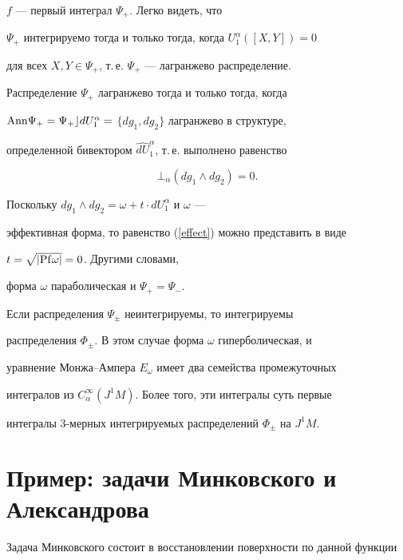 \begin{pf}
$f$ --- первый интеграл $\Psi_{+}$. Легко видеть, что


$\Psi_{+}$ интегрируемо тогда и только тогда, когда $U_1^\alpha ([X,Y])=0$ 


для всех $X,Y\in \Psi_+$, т.\,е. $\Psi_+$ --- лагранжево распределение.


Распределение $\Psi_{+}$ лагранжево тогда и только тогда, когда 


${\Ann}\Psi


_{+}=\Psi_{+}\rfloor dU_1^\alpha =$ $\{dg_1,dg_2\}$ лагранжево в структуре,


определенной бивектором $\widehat{dU}_1^\alpha $, т.\,е. выполнено равенство


\begin{equation}


\bot_\alpha (dg_1\wedge dg_2)=0. \label{effect}


\end{equation}


Поскольку $dg_1\wedge dg_2=\omega +t\cdot dU_1^\alpha $ и $\omega$ ---


эффективная форма, то равенство (\ref{effect}) можно представить в виде


$t=\sqrt{| {\operatorname{Pf}}\omega|}=0$. Другими словами,


форма $\omega$ параболическая и $\Psi_{+}=\Psi_{-}$.





Если распределения $\Psi_{\pm }$ неинтегрируемы, то интегрируемы 


распределения $\Phi_{\pm }$. В этом случае форма $\omega$ гиперболическая, и


уравнение Монжа--Ампера $E_\omega$ имеет два семейства промежуточных


интегралов из $C_\alpha^\infty(J^1M)$. Более того, эти интегралы суть первые


интегралы 3-мерных интегрируемых распределений $\Phi_{\pm }$ на $J^1M$.


\end{pf}





\section{Пример: задачи Минковского и Александрова}





Задача Минковского состоит в восстановлении поверхности по данной функции


